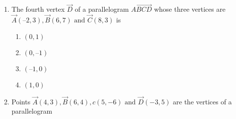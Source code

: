 \begin{enumerate}[label=\thesection.\arabic*,ref=\thesection.\theenumi]
\item The fourth vertex $\vec{D}$ of a parallelogram $\vec{ABCD}$ whose three vertices are
	$\vec{A} (–2, 3), \vec{B} (6, 7)\text { and } \vec{C} (8, 3)$ is
\begin{enumerate}
	\item $(0, 1)$
	\item $(0, –1)$
	\item $ (–1,0)$
	\item$(1, 0)$
\end{enumerate}
\item Points $\vec{A}(4,3), \vec{B}(6,4),{c}(5,-6) \text{ and } \vec{D}(-3,5)$ are the vertices of a parallelogram  
\end{enumerate}
